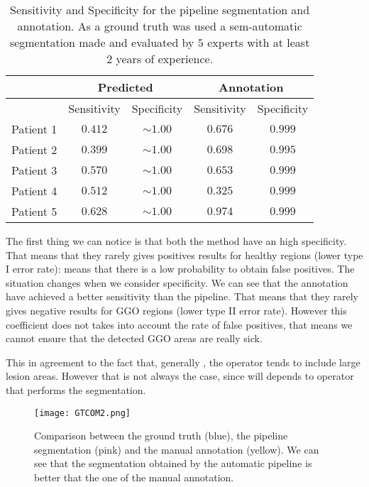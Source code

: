\documentclass{standalone}
\begin{document}
		\begin{table}[h!]
		\centering
		\begin{tabular}{|c|c|c|c|c|}
			\hline
			\multirow{2}{*}{}		  & \multicolumn{2}{c|}{Predicted} & \multicolumn{2}{c|}{Annotation} \\ \hline
						& Sensitivity & Specificity	 		& Sensitivity & Specificity		 \\ \hline
			Patient 1	& $0.412$	  &	$\sim 1.00$			&	$0.676$	  &	$ 0.999$ 		 \\ 
			Patient 2	& $0.399$	  & $\sim 1.00$ 		&	$0.698$	  & $ 0.995$		 \\
			Patient 3	& $0.570$	  &	$\sim 1.00$			&	$0.653$	  & $ 0.999$		 \\
			Patient 4	& $0.512$	  & $\sim 1.00$			&	$0.325$	  & $ 0.999$		 \\
			Patient 5 	& $0.628$	  & $\sim 1.00$			&	$0.974$	  &	$ 0.999$		 \\ \hline
		\end{tabular}\caption{Sensitivity and Specificity for the pipeline segmentation and annotation. As a ground truth was used a sem-automatic segmentation made and evaluated by $5$ experts with at least $2$ years of experience.}\label{tab:Measures}
		
	\end{table}

 	The first thing we can notice is that both the method have an high specificity. That means that  they rarely gives positives results for healthy regions (lower type I error rate): means that there is a low probability to obtain false positives. 
 	The situation changes when we consider specificity. We can see that the annotation have achieved a better sensitivity than the pipeline. That means that they rarely gives negative results for GGO regions (lower type II error rate). However this coefficient does not takes into account the rate of false positives, that means we cannot ensure that the detected GGO areas are really sick.
 	
 	This in agreement to the fact that, generally , the operator tends to include large lesion areas. However that is not always the case, since will depends to operator that performs the segmentation.
 	
 	
 	\begin{figure}[h!]
 		\texttt{[image: GTCOM2.png]}
 		
 		\caption{Comparison between the ground truth (blue), the pipeline segmentation (pink) and the manual annotation (yellow). We can see that the segmentation obtained by the automatic pipeline is better that the one of the manual annotation.}\label{fig:conf2}
 	\end{figure}
 
\end{document}
